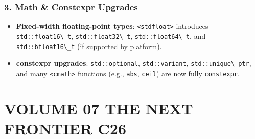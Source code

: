 \hypertarget{math-constexpr-upgrades}{%
\subsubsection{3. Math \& Constexpr
Upgrades}\label{math-constexpr-upgrades}}

\begin{itemize}
\tightlist
\item
  \textbf{Fixed-width floating-point types}:
  \passthrough{\lstinline!<stdfloat>!} introduces
  \passthrough{\lstinline!std::float16\_t!},
  \passthrough{\lstinline!std::float32\_t!},
  \passthrough{\lstinline!std::float64\_t!}, and
  \passthrough{\lstinline!std::bfloat16\_t!} (if supported by platform).
\item
  \textbf{constexpr upgrades}: \passthrough{\lstinline!std::optional!},
  \passthrough{\lstinline!std::variant!},
  \passthrough{\lstinline!std::unique\_ptr!}, and many
  \passthrough{\lstinline!<cmath>!} functions (e.g.,
  \passthrough{\lstinline!abs!}, \passthrough{\lstinline!ceil!}) are now
  fully \passthrough{\lstinline!constexpr!}.
\end{itemize}

\hypertarget{volume-07-the-next-frontier-c26}{%
\section{VOLUME 07 THE NEXT FRONTIER
C26}\label{volume-07-the-next-frontier-c26}}
